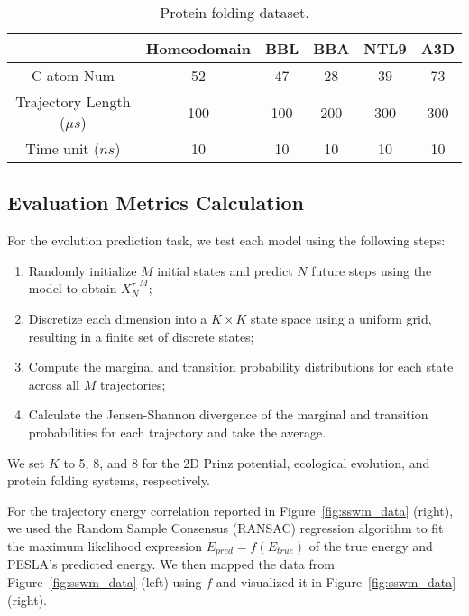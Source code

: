 \begin{table}[!ht]
    \centering
    \caption{Protein folding dataset.}
    \label{tab:data_protein}
    \begin{tabular}{c|ccccc}
        \hline
        & Homeodomain & BBL & BBA & NTL9 & A3D \\
        \hline
        C-atom Num & 52 & 47 & 28 & 39 & 73 \\
        \hline
        Trajectory Length ($\mu s$) & 100 & 100 & 200 & 300 & 300 \\
        \hline
        Time unit ($ns$) & 10 & 10 & 10 & 10 & 10 \\
        \hline
    \end{tabular}
\end{table}


\subsection{Evaluation Metrics Calculation} \label{app:metrics_calculation}

For the evolution prediction task, we test each model using the following steps:
\begin{enumerate}
    \item Randomly initialize $M$ initial states and predict $N$ future steps using the model to obtain ${X^{\tau}_N}^M$;
    \item Discretize each dimension into a $K \times K$ state space using a uniform grid, resulting in a finite set of discrete states;
    \item Compute the marginal and transition probability distributions for each state across all $M$ trajectories;
    \item Calculate the Jensen-Shannon divergence of the marginal and transition probabilities for each trajectory and take the average.
\end{enumerate}
We set $K$ to 5, 8, and 8 for the 2D Prinz potential, ecological evolution, and protein folding systems, respectively.

For the trajectory energy correlation reported in Figure~\ref{fig:sswm_data} (right), we used the Random Sample Consensus (RANSAC) regression algorithm to fit the maximum likelihood expression $E_{pred} = f(E_{true})$ of the true energy and PESLA's predicted energy. We then mapped the data from Figure~\ref{fig:sswm_data} (left) using $f$ and visualized it in Figure~\ref{fig:sswm_data} (right).



